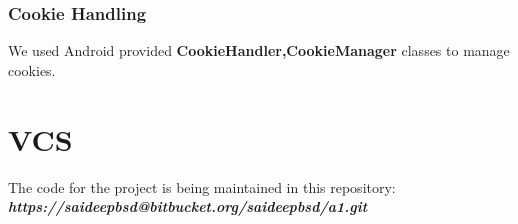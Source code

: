 \documentclass[12pt]{article}
\begin{document}
\subsubsection{Cookie Handling}

We used Android provided \textbf{CookieHandler,CookieManager}  classes to manage cookies. 
\section{VCS}
The code for the project is being maintained in this repository:\\
\textbf{{\em     https://saideepbsd@bitbucket.org/saideepbsd/a1.git}}



\end{document}

